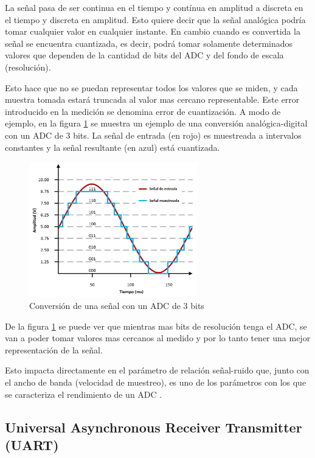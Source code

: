 La señal pasa de ser continua en el tiempo y contínua en amplitud a discreta en el tiempo y discreta en amplitud. Esto quiere decir que la señal analógica podría tomar cualquier valor en cualquier instante. En cambio cuando es convertida la señal se encuentra cuantizada, es decir, podrá tomar solamente determinados valores que dependen de la cantidad de bits del ADC y del fondo de escala (resolución).

Esto hace que no se puedan representar todos los valores que se miden, y cada muestra tomada estará truncada al valor mas cercano representable. Este error introducido en la medición se denomina error de cuantización. A modo de ejemplo, en la figura \ref{fig:muestreoADC} se muestra un ejemplo de una conversión analógica-digital con un ADC de 3 bits. La señal de entrada (en rojo) es muestreada a intervalos constantes y la señal resultante (en azul) está cuantizada.

\begin{figure}[H]
\centering
\includegraphics[width=0.65\textwidth]{./Figures/muestreo.png}
\caption{Conversión de una señal con un ADC de 3 bits}
\label{fig:muestreoADC}
\end{figure}

De la figura \ref{fig:muestreoADC} se puede ver que mientras mas bits de resolución tenga el ADC, se van a poder tomar valores mas cercanos al medido y por lo tanto tener una mejor representación de la señal.

Esto impacta directamente en el parámetro de relación señal-ruido que, junto con el ancho de banda (velocidad de muestreo), es uno de los parámetros con los que se caracteriza el rendimiento de un ADC \citep{WEBSITE:2}.

\subsection{Universal Asynchronous Receiver Transmitter (UART)}


